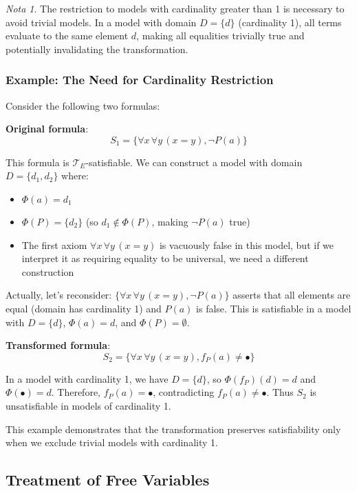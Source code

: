 \documentclass[11pt,a4paper]{article}
\theoremstyle{definition}
\theoremstyle{plain}
\theoremstyle{remark}
\newtheorem*{remark}{Nota}
\begin{document}
\begin{remark}
The restriction to models with cardinality greater than 1 is necessary to avoid trivial models. In a model with domain $D = \{d\}$ (cardinality 1), all terms evaluate to the same element $d$, making all equalities trivially true and potentially invalidating the transformation.
\end{remark}

\subsubsection{Example: The Need for Cardinality Restriction}

Consider the following two formulas:

\textbf{Original formula}:
\[
S_1 = \{\forall x \, \forall y \, (x = y), \neg P(a)\}
\]

This formula is $\mathcal{T}_E$-satisfiable. We can construct a model with domain $D = \{d_1, d_2\}$ where:
\begin{itemize}
    \item $\Phi(a) = d_1$
    \item $\Phi(P) = \{d_2\}$ (so $d_1 \notin \Phi(P)$, making $\neg P(a)$ true)
    \item The first axiom $\forall x \, \forall y \, (x = y)$ is vacuously false in this model, but if we interpret it as requiring equality to be universal, we need a different construction
\end{itemize}

Actually, let's reconsider: $\{\forall x \, \forall y \, (x = y), \neg P(a)\}$ asserts that all elements are equal (domain has cardinality 1) and $P(a)$ is false. This is satisfiable in a model with $D = \{d\}$, $\Phi(a) = d$, and $\Phi(P) = \emptyset$.

\textbf{Transformed formula}:
\[
S_2 = \{\forall x \, \forall y \, (x = y), f_P(a) \neq \bullet\}
\]

In a model with cardinality 1, we have $D = \{d\}$, so $\Phi(f_P)(d) = d$ and $\Phi(\bullet) = d$. Therefore, $f_P(a) = \bullet$, contradicting $f_P(a) \neq \bullet$. Thus $S_2$ is unsatisfiable in models of cardinality 1.

This example demonstrates that the transformation preserves satisfiability only when we exclude trivial models with cardinality 1.

\subsection{Treatment of Free Variables}
\end{document}
